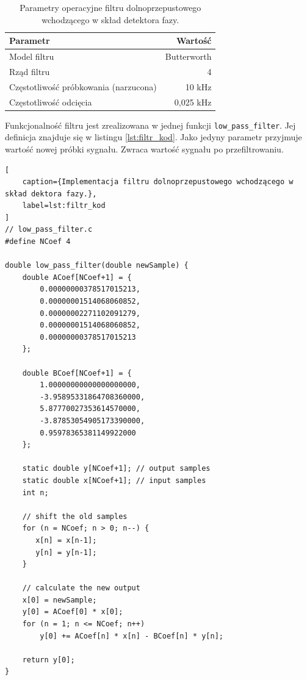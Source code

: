 \begin{table}[h]
    \centering
    \begin{tabular}{lr}
        \toprule
        \textbf{Parametr} & \textbf{Wartość} \\
        \midrule
        Model filtru & Butterworth \\
        Rząd filtru & 4 \\
        Częstotliwość próbkowania (narzucona) & 10 kHz \\
        Częstotliwość odcięcia & 0,025 kHz \\
        \bottomrule
    \end{tabular}
    \caption{Parametry operacyjne filtru dolnoprzepustowego wchodzącego w skład detektora fazy.}
    \label{tab:filtr_parametry}
\end{table}

\noindent Funkcjonalność filtru jest zrealizowana w jednej funkcji
\texttt{low\_pass\_filter}. Jej definicja znajduje się w listingu
\ref{lst:filtr_kod}. Jako jedyny parametr przyjmuje wartość nowej próbki
sygnału. Zwraca wartość sygnału po przefiltrowaniu.

\begin{lstlisting}[
    caption={Implementacja filtru dolnoprzepustowego wchodzącego w skład dektora fazy.},
    label=lst:filtr_kod
]
// low_pass_filter.c
#define NCoef 4

double low_pass_filter(double newSample) {
    double ACoef[NCoef+1] = {
        0.00000000378517015213,
        0.00000001514068060852,
        0.00000002271102091279,
        0.00000001514068060852,
        0.00000000378517015213
    };

    double BCoef[NCoef+1] = {
        1.00000000000000000000,
        -3.95895331864708360000,
        5.87770027353614570000,
        -3.87853054905173390000,
        0.95978365381149922000
    };

    static double y[NCoef+1]; // output samples
    static double x[NCoef+1]; // input samples
    int n;

    // shift the old samples
    for (n = NCoef; n > 0; n--) {
       x[n] = x[n-1];
       y[n] = y[n-1];
    }

    // calculate the new output
    x[0] = newSample;
    y[0] = ACoef[0] * x[0];
    for (n = 1; n <= NCoef; n++)
        y[0] += ACoef[n] * x[n] - BCoef[n] * y[n];

    return y[0];
}
\end{lstlisting}

